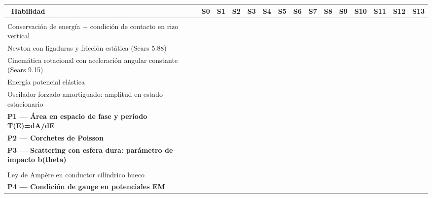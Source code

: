 \documentclass[10pt]{article}
\renewcommand{\arraystretch}{1.28}
\begin{document}
{\renewcommand{\arraystretch}{1.34}\setlength{\tabcolsep}{5.2pt}
\noindent\begin{tabular}{@{}|p{10.4cm}|c|c|c|c|c|c|c|c|c|c|c|c|c|c|}
\hline
\rowcolor{cab}\color{white}\textbf{\ Habilidad} & \color{white}\scriptsize\textbf{S0} & \color{white}\scriptsize\textbf{S1} & \color{white}\scriptsize\textbf{S2} & \color{white}\scriptsize\textbf{S3} & \color{white}\scriptsize\textbf{S4} & \color{white}\scriptsize\textbf{S5} & \color{white}\scriptsize\textbf{S6} & \color{white}\scriptsize\textbf{S7} & \color{white}\scriptsize\textbf{S8} & \color{white}\scriptsize\textbf{S9} & \color{white}\scriptsize\textbf{S10} & \color{white}\scriptsize\textbf{S11} & \color{white}\scriptsize\textbf{S12} & \color{white}\scriptsize\textbf{S13}\\ \hline
\rowcolor{gris}\multicolumn{15}{|l|}{\textbf{\small Mecánica}}\\ \hline
\scriptsize Conservación de energía + condición de contacto en rizo vertical &   &   &   &   &   &   &   &   &   &   &   &   &   &  \\ \hline
\scriptsize Newton con ligaduras y fricción estática (Sears 5.88) &   &   &   &   &   &   &   &   &   &   &   &   &   &  \\ \hline
\scriptsize Cinemática rotacional con aceleración angular constante (Sears 9.15) &   &   &   &   &   &   &   &   &   &   &   &   &   &  \\ \hline
\scriptsize Energía potencial elástica &   &   &   &   &   &   &   &   &   &   &   &   &   &  \\ \hline
\scriptsize Oscilador forzado amortiguado: amplitud en estado estacionario &   &   &   &   &   &   &   &   &   &   &   &   &   &  \\ \hline
\scriptsize \textbf{P1 — Área en espacio de fase y período T(E)=dA/dE} &   &   &   &   &   &   &   &   &   &   &   &   &   &  \\ \hline
\scriptsize \textbf{P2 — Corchetes de Poisson} &   &   &   &   &   &   &   &   &   &   &   &   &   &  \\ \hline
\scriptsize \textbf{P3 — Scattering con esfera dura: parámetro de impacto b(theta)} &   &   &   &   &   &   &   &   &   &   &   &   &   &  \\ \hline
\rowcolor{gris}\multicolumn{15}{|l|}{\textbf{\small Electromagnetismo}}\\ \hline
\scriptsize Ley de Ampère en conductor cilíndrico hueco &   &   &   &   &   &   &   &   &   &   &   &   &   &  \\ \hline
\scriptsize \textbf{P4 — Condición de gauge en potenciales EM} &   &   &   &   &   &   &   &   &   &   &   &   &   &  \\ \hline

\end{tabular}}
\end{document}
